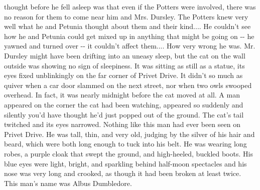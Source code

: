 \documentclass{article}%
\begin{document}
thought before he fell asleep was that even if the Potters were
\newline%
involved, there was no reason for them to come near him and Mrs.
\newline%
Dursley. The Potters knew very well what he and Petunia thought about
\newline%
them and their kind.... He couldn't see how he and Petunia could get
\newline%
mixed up in anything that might be going on {-}{-} he yawned and turned over
\newline%
{-}{-} it couldn't affect them....
\newline%
How very wrong he was.
\newline%
Mr. Dursley might have been drifting into an uneasy sleep, but the cat
\newline%
on the wall outside was showing no sign of sleepiness. It was sitting as
\newline%
still as a statue, its eyes fixed unblinkingly on the far corner of
\newline%
Privet Drive. It didn't so much as quiver when a car door slammed on the
\newline%
next street, nor when two owls swooped overhead. In fact, it was nearly
\newline%
midnight before the cat moved at all.
\newline%
A man appeared on the corner the cat had been watching, appeared so
\newline%
suddenly and silently you'd have thought he'd just popped out of the
\newline%
ground. The cat's tail twitched and its eyes narrowed.
\newline%
Nothing like this man had ever been seen on Privet Drive. He was tall,
\newline%
thin, and very old, judging by the silver of his hair and beard, which
\newline%
were both long enough to tuck into his belt. He was wearing long robes,
\newline%
a purple cloak that swept the ground, and high{-}heeled, buckled boots.
\newline%
His blue eyes were light, bright, and sparkling behind half{-}moon
\newline%
spectacles and his nose was very long and crooked, as though it had been
\newline%
broken at least twice. This man's name was Albus Dumbledore.
\end{document}
